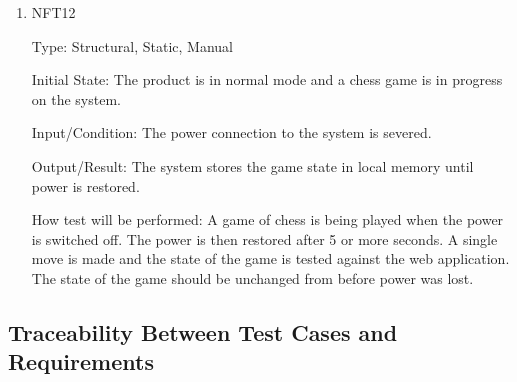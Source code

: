 \documentclass[12pt, titlepage]{article}
\begin{document}
\begin{enumerate}
    \item{NFT12}

        Type: Structural, Static, Manual
                            
        Initial State: The product is in normal mode and a chess game is in progress on the system.
                            
        Input/Condition: The power connection to the system is severed.
                            
        Output/Result: The system stores the game state in local memory until power is restored.
                            
        How test will be performed: A game of chess is being played when the power is switched off. The power is then restored after 5 or more seconds. A single
            move is made and the state of the game is tested against the web application. The state of the game should be unchanged from before power was lost.
\end{enumerate}

\subsection{Traceability Between Test Cases and Requirements}
\end{document}
